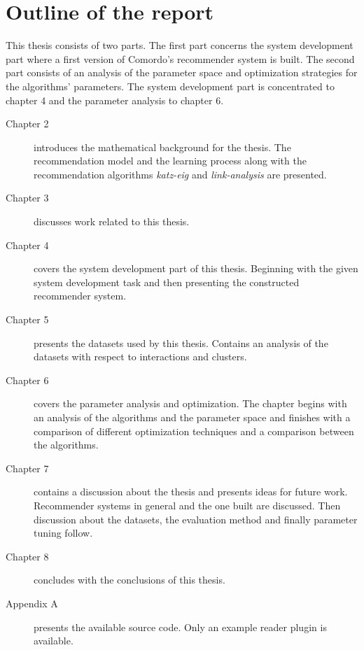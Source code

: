 
\section{Outline of the report}\label{sec:intro:outline}

This thesis consists of two parts. The first part concerns the system development part where a first version of Comordo's recommender system is built. The second part consists of an analysis of the parameter space and optimization strategies for the algorithms' parameters. The system development part is concentrated to chapter 4 and the parameter analysis to chapter 6.

\begin{description}
    \item[Chapter 2] introduces the mathematical background for the thesis. The recommendation model and the learning process along with the recommendation algorithms \textit{katz-eig} and \textit{link-analysis} are presented.
    \item[Chapter 3] discusses work related to this thesis.
    \item[Chapter 4] covers the system development part of this thesis. Beginning with the given system development task and then presenting the constructed recommender system.
    \item[Chapter 5] presents the datasets used by this thesis. Contains an analysis of the datasets with respect to interactions and clusters.
    \item[Chapter 6] covers the parameter analysis and optimization. The chapter begins with an analysis of the algorithms and the parameter space and finishes with a comparison of different optimization techniques and a comparison between the algorithms.
    \item[Chapter 7] contains a discussion about the thesis and presents ideas for future work. Recommender systems in general and the one built are discussed. Then discussion about the datasets, the evaluation method and finally parameter tuning follow.
    \item[Chapter 8] concludes with the conclusions of this thesis.
    \item[Appendix A] presents the available source code. Only an example reader plugin is available.
\end{description}

